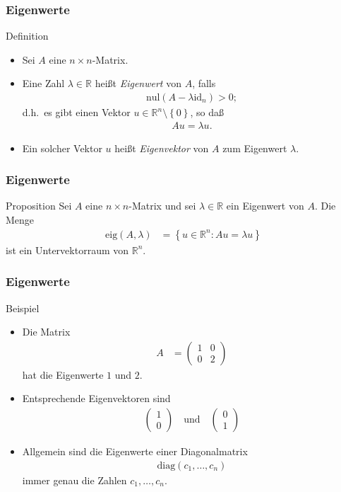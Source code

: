 \documentclass{beamer}
\title[Linadi]{\mytitle}
\author[Amin Coja-Oghlan]{Amin Coja-Oghlan}
\institute[Frankfurt]{JWGUFFM}
\date{}
\renewcommand{\emph}[1]{{\textcolor{solarizedRed}{\itshape #1}}}
\newcommand\RR{\mathbb R}
\newcommand{\id}{\mathrm{id}}
\newcommand\cbc[1]{\left\{{#1}\right\}}
\newcommand{\diag}{\mathrm{diag}}
\newcommand{\nul}{\mathrm{nul}}
\newcommand{\eig}{\mathrm{eig}}
\newcommand{\mytitle}{Eigenwerte}
\begin{document}
\frame[plain]{\titlepage}

\begin{frame}\frametitle{\mytitle}
	\begin{block}{Definition}
		\begin{itemize}
			\item Sei $A$ eine $n\times n$-Matrix.
			\item Eine Zahl $\lambda\in\RR$ hei\ss t \emph{Eigenwert} von $A$, falls
				\begin{align*}
					\nul(A-\lambda\id_n)>0;
				\end{align*}
			d.h.\ es gibt einen Vektor $u\in\RR^n\setminus\cbc 0$, so da\ss\
				\begin{align*}
				Au=\lambda u.
				\end{align*}
			\item Ein solcher Vektor $u$ hei\ss t \emph{Eigenvektor} von $A$ zum Eigenwert $\lambda$.
		\end{itemize}
	\end{block}
\end{frame}

\begin{frame}\frametitle{\mytitle}
	\begin{block}{Proposition}
		Sei $A$ eine $n\times n$-Matrix und sei $\lambda\in\RR$ ein Eigenwert von $A$.
		Die Menge
		\begin{align*}
			\eig(A,\lambda)&=\cbc{u\in\RR^n:Au=\lambda u}
		\end{align*}
		ist ein Untervektorraum von $\RR^n$.
	\end{block}
\end{frame}

\begin{frame}\frametitle{\mytitle}
	\begin{block}{Beispiel}
		\begin{itemize}
			\item Die Matrix
				\begin{align*}
					A&=\begin{pmatrix} 1&0\\0&2 \end{pmatrix}
				\end{align*}
				hat die Eigenwerte $1$ und $2$.
			\item Entsprechende Eigenvektoren sind
				\begin{align*}
					\begin{pmatrix} 1\\0 \end{pmatrix}\quad\mbox{und}\quad
				\begin{pmatrix} 0\\1 \end{pmatrix}
				\end{align*}
			\item Allgemein sind die Eigenwerte einer Diagonalmatrix
				\begin{align*}
					\diag(c_1,\ldots,c_n)
				\end{align*}
				immer genau die Zahlen $c_1,\ldots,c_n$.
		\end{itemize}
	\end{block}
\end{frame}
\end{document}
